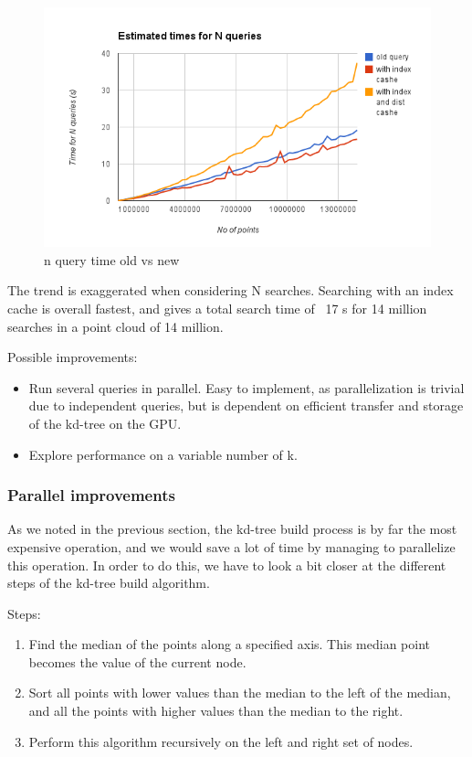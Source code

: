 \begin{figure}[ht!]
\centering
\includegraphics[width=120mm]{../gfx/n-query-time-old-vs-new.png}

\caption{n query time old vs new}
\label{fig:n_query_time_old_vs_new}
\end{figure}

The trend is exaggerated when considering N searches. Searching with an index cache is overall fastest, and gives a total search time of ~17 s for 14 million searches in a point cloud of 14 million.


Possible improvements:
\begin{itemize}
    \item Run several queries in parallel. Easy to implement, as parallelization is trivial due to independent queries, but is dependent on efficient transfer and storage of the kd-tree on the GPU.
    \item Explore performance on a variable number of k.
\end{itemize}

\subsubsection{Parallel improvements} %
\label{ssub:parallel_improvements}

As we noted in the previous section, the kd-tree build process is by far the most expensive operation, and we would save a lot of time by managing to parallelize this operation. In order to do this, we have to look a bit closer at the different steps of the kd-tree build algorithm.

Steps:
\begin{enumerate}
    \item Find the median of the points along a specified axis. This median point becomes the value of the current node.
    \item Sort all points with lower values than the median to the left of the median, and all the points with higher values than the median to the right.
    \item Perform this algorithm recursively on the left and right set of nodes.
\end{enumerate}

